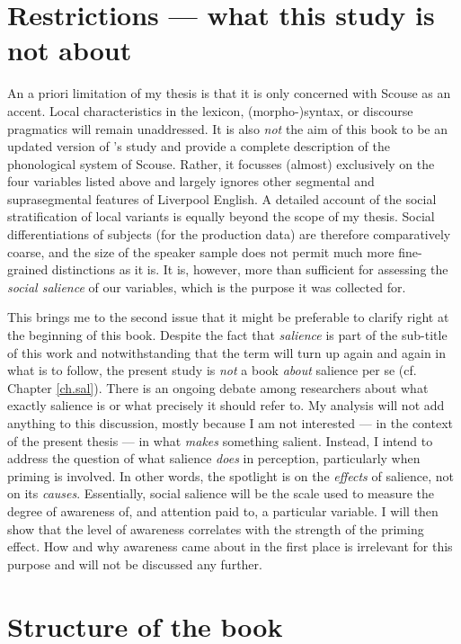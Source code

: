 \section{Restrictions --- what this study is not about}
\label{sec.intro.restrict}

An a priori limitation of my thesis is that it is only concerned with Scouse as an accent.
Local characteristics in the lexicon, (morpho-)syntax, or discourse pragmatics will remain unaddressed.
It is also \emph{not} the aim of this book to be an updated version of \citeauthor{knowles1973}'s \citeyear{knowles1973} study and provide a complete description of the phonological system of Scouse.
Rather, it focusses (almost) exclusively on the four variables listed above and largely ignores other segmental and suprasegmental features of Liverpool English.
A detailed account of the social stratification of local variants is equally beyond the scope of my thesis.
Social differentiations of subjects (for the production data) are therefore comparatively coarse, and the size of the speaker sample does not permit much more fine-grained distinctions as it is.
It is, however, more than sufficient for assessing the \emph{social salience} of our variables, which is the purpose it was collected for.

This brings me to the second issue that it might be preferable to clarify right at the beginning of this book.
Despite the fact that \emph{salience} is part of the sub-title of this work and notwithstanding that the term will turn up again and again in what is to follow, the present study is \emph{not} a book \emph{about} salience per se (cf. Chapter \ref{ch.sal}).
There is an ongoing debate among researchers about what exactly salience is or what precisely it should refer to.
My analysis will not add anything to this discussion, mostly because I am not interested --- in the context of the present thesis --- in what \emph{makes} something salient.
Instead, I intend to address the question of what salience \emph{does} in perception, particularly when priming is involved.
In other words, the spotlight is on the \emph{effects} of salience, not on its \emph{causes}.
Essentially, social salience will be the scale used to measure the degree of awareness of, and attention paid to, a particular variable.
I will then show that the level of awareness correlates with the strength of the priming effect.
How and why awareness came about in the first place is irrelevant for this purpose and will not be discussed any further.

\section{Structure of the book}
\label{sec.intro.structure}

